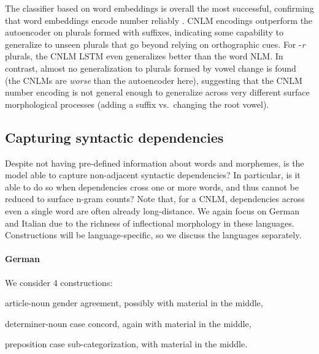 The classifier based on word embeddings is overall the most
successful, confirming that word embeddings encode number reliably
\cite{Mikolov:etal:2013a}.  CNLM encodings outperform the autoencoder
on plurals formed with suffixes, indicating some capability to
generalize to unseen plurals that go beyond relying on orthographic
cues.  For -\emph{r} plurals, the CNLM LSTM even generalizes better
than the word NLM.  In contrast, almost no generalization to plurals
formed by vowel change is found (the CNLMs are \emph{worse} than the
autoencoder here), suggesting that the CNLM number encoding is not
general enough to generalize across very different surface
morphological processes (adding a suffix vs.~changing the root vowel).

\subsection{Capturing syntactic dependencies}
\label{sec:dependencies}

Despite not having pre-defined information about words and morphemes, is the model able to capture non-adjacent syntactic dependencies?
In particular, is it able to do so when dependencies cross one or more words, and thus cannot be reduced to surface n-gram counts?
Note that, for a CNLM, dependencies across even a single word are often already long-distance. %
We again focus on German and Italian due to the richness of inflectional morphology in these languages.
Constructions will be language-specific, so we discuss the languages separately. %





\paragraph{German} We consider 4 constructions:
\begin{inparaenum}[i)]
\item article-noun gender agreement, possibly with material in the middle,
\item determiner-noun case concord, again with material in the middle,
\item preposition case sub-categorization, with material in the middle.
\end{inparaenum}


